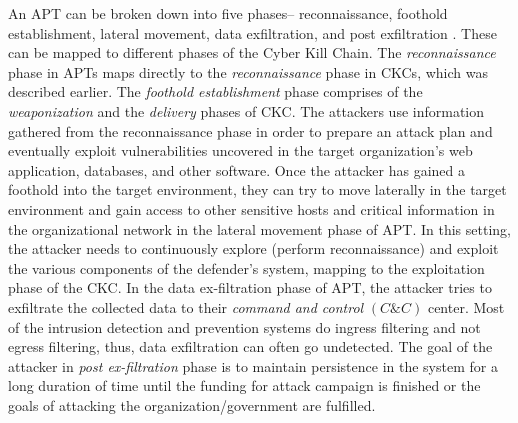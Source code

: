 An APT can be broken down into five phases-- reconnaissance, foothold establishment, lateral movement, data exfiltration, and post exfiltration . These can be mapped to different phases of the Cyber Kill Chain.
The {\em reconnaissance} phase in APTs maps directly to the {\em reconnaissance} phase in CKCs, which was described earlier. The \textit{foothold establishment} phase comprises of the \emph{weaponization} and the \emph{delivery} phases of CKC. The attackers use information gathered from the reconnaissance phase in order to prepare an attack plan and eventually exploit vulnerabilities uncovered in the target organization's web application, databases, and other software.
Once the attacker has gained a foothold into the target environment, they can try to move laterally in the target environment and gain access to other sensitive hosts and critical information in the organizational network in the lateral movement phase of APT. In this setting, the attacker needs to continuously explore (perform reconnaissance) and exploit the various components of the defender's system, mapping to the exploitation phase of the CKC.
In the data ex-filtration phase of APT, the attacker tries to exfiltrate the collected data to their \emph{command and control} $(C\&C)$ center. Most of the intrusion detection and prevention systems do ingress filtering and not egress filtering, thus, data exfiltration can often go undetected. 
The goal of the attacker in \emph{post ex-filtration} phase is to maintain persistence in the system for a long duration of time until the funding for attack campaign is finished or the goals of attacking the organization/government are fulfilled.

